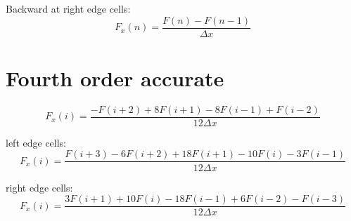 \documentclass[12pt, a4paper, openany]{memoir}
\begin{document}
Backward at right edge cells:
\begin{equation}
F_x(n) = \frac{F(n)-F(n-1)}{\Delta x}
\end{equation}

\section{Fourth order accurate}

\begin{equation}
F_x(i) = \frac{-F(i+2)+8F(i+1)-8F(i-1)+F(i-2)}{12 \Delta x}
\end{equation}

left edge cells:
\begin{equation}
F_x(i) = \frac{F(i+3)-6F(i+2)+18F(i+1)-10F(i) -3F(i-1)}{12 \Delta x}
\end{equation}

right edge cells:
\begin{equation}
F_x(i) = \frac{3F(i+1)+10F(i)-18F(i-1)+6F(i-2) -F(i-3)}{12 \Delta x}
\end{equation}
\end{document}
